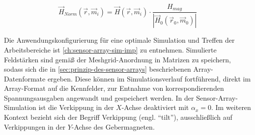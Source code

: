\begin{equation}\label{eq:dipnorm}
	\vec{H}_{Norm}(\vec{r},\vec{m}_i) = \vec{H}(\vec{r},\vec{m}_i) \cdot \frac{H_{mag}}{|\vec{H}_0(\vec{r}_0,\vec{m}_0)|}
\end{equation}


Die Anwendungskonfigurierung für eine optimale Simulation und Treffen der Arbeitsbereiche ist \autoref{ch:sensor-array-sim-imp} zu entnehmen. Simulierte Feldstärken sind gemäß der Meshgrid-Anordnung in Matrizen zu speichern, sodass sich die in \autoref{sec:prinzip-des-sensor-arrays} beschriebenen Array-Datenformate ergeben. Diese können im Simulationsverlauf fortführend, direkt im Array-Format auf die Kennfelder, zur Entnahme von korrespondierenden Spannungsausgaben angewandt und gespeichert werden. In der Sensor-Array-Simulation ist die Verkippung in der $X$-Achse deaktiviert mit $\alpha_x = 0$. Im weiteren Kontext bezieht sich der Begriff Verkippung (engl. ``tilt''), ausschließlich auf Verkippungen in der $Y$-Achse des Gebermagneten.


\clearpage

